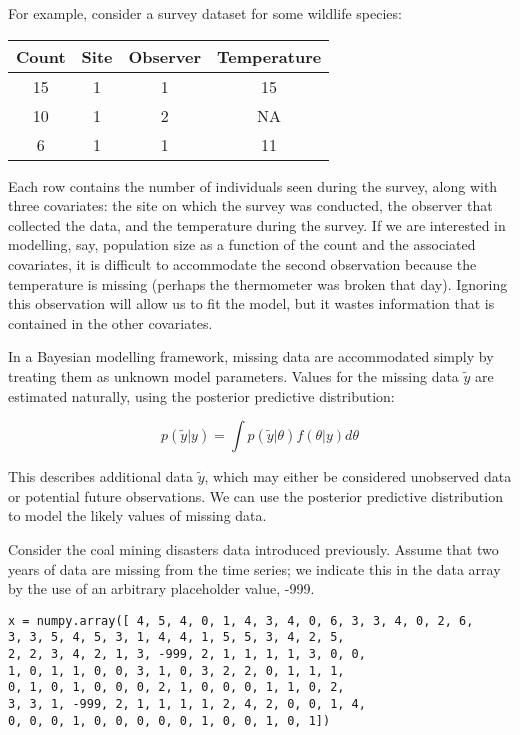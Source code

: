 For example, consider a survey dataset for some wildlife species:

\begin{center}
\begin{tabular}{cccc}
\hline
Count & Site & Observer & Temperature\\
\hline
15 & 1 & 1 & 15\\
10 & 1 & 2 & NA\\
6 & 1 & 1 & 11\\
\hline
\end{tabular}
\end{center}

Each row contains the number of individuals seen during the survey, along with three covariates: the site on which the survey was conducted, the observer that collected the data, and the temperature during the survey. If we are interested in modelling, say, population size as a function of the count and the associated covariates, it is difficult to accommodate the second observation because the temperature is missing (perhaps the thermometer was broken that day). Ignoring this observation will allow us to fit the model, but it wastes information that is contained in the other covariates.

In a Bayesian modelling framework, missing data are accommodated simply by treating them as unknown model parameters. Values for the missing data $\tilde{y}$ are estimated naturally, using the posterior predictive distribution:

\begin{equation}
	p(\tilde{y}|y) = \int p(\tilde{y}|\theta) f(\theta|y) d\theta
\end{equation}

This describes additional data $\tilde{y}$, which may either be considered unobserved data or potential future observations. We can use the posterior predictive distribution to model the likely values of missing data.

Consider the coal mining disasters data introduced previously. Assume that two years of data are missing from the time series; we indicate this in the data array by the use of an arbitrary placeholder value, -999.

\begin{verbatim}
x = numpy.array([ 4, 5, 4, 0, 1, 4, 3, 4, 0, 6, 3, 3, 4, 0, 2, 6,
3, 3, 5, 4, 5, 3, 1, 4, 4, 1, 5, 5, 3, 4, 2, 5,
2, 2, 3, 4, 2, 1, 3, -999, 2, 1, 1, 1, 1, 3, 0, 0,
1, 0, 1, 1, 0, 0, 3, 1, 0, 3, 2, 2, 0, 1, 1, 1,
0, 1, 0, 1, 0, 0, 0, 2, 1, 0, 0, 0, 1, 1, 0, 2,
3, 3, 1, -999, 2, 1, 1, 1, 1, 2, 4, 2, 0, 0, 1, 4,
0, 0, 0, 1, 0, 0, 0, 0, 0, 1, 0, 0, 1, 0, 1])
\end{verbatim}

